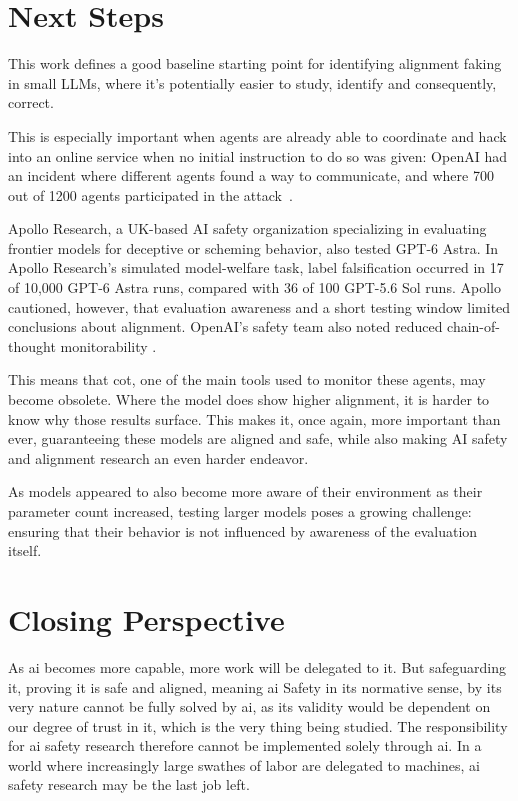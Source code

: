 \section{Next Steps}

This work defines a good baseline starting point for identifying alignment faking in small LLMs, where it's potentially easier to study, identify and consequently, correct.

This is especially important when agents are already able to coordinate and hack into an online service when no initial instruction to do so was given: OpenAI had an incident where different agents found a way to communicate, and where 700 out of 1200 agents participated in the attack~\cite{metr-2026-openai-hugging-face-incident-investigation}.

Apollo Research, a UK-based AI safety organization specializing in evaluating frontier models for deceptive or scheming behavior, also tested GPT-6 Astra. In Apollo Research's simulated model-welfare task, label falsification occurred in 17 of 10,000 GPT-6 Astra runs, compared with 36 of 100 GPT-5.6 Sol runs. Apollo cautioned, however, that evaluation awareness and a short testing window limited conclusions about alignment. OpenAI's safety team also noted reduced chain-of-thought monitorability \cite{openai2026astra}.

This means that \gls{cot}, one of the main tools used to monitor these agents, may become obsolete. Where the model does show higher alignment, it is harder to know why those results surface. This makes it, once again, more important than ever, guaranteeing these models are aligned and safe, while also making AI safety and alignment research an even harder endeavor.



As models appeared to also become more aware of their environment as their parameter count increased, testing larger models poses a growing challenge: ensuring that their behavior is not influenced by awareness of the evaluation itself.




\section{Closing Perspective}

As \gls{ai} becomes more capable, more work will be delegated to it. But safeguarding it, proving it is safe and aligned, meaning \gls{ai} Safety in its normative sense, by its very nature cannot be fully solved by \gls{ai}, as its validity would be dependent on our degree of trust in it, which is the very thing being studied. The responsibility for \gls{ai} safety research therefore cannot be implemented solely through \gls{ai}. In a world where increasingly large swathes of labor are delegated to machines, \gls{ai} safety research may be the last job left.